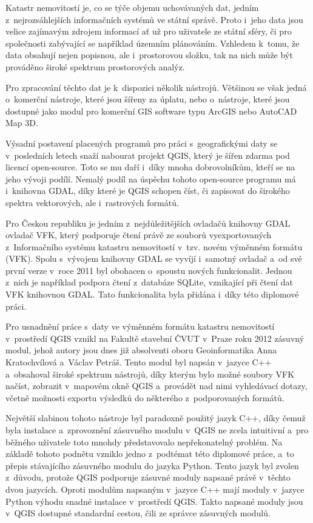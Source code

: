 \documentclass[a4paper,12pt,oneside]{book}
\begin{document}
Katastr nemovitostí je, co se týče objemu uchovávaných dat, jedním z~nejrozsáhlejších informačních systémů ve státní správě. Proto i~jeho data jsou velice zajímavým zdrojem informací ať už pro uživatele ze státní sféry, či pro společnosti zabývající se například územním plánováním. Vzhledem k~tomu, že data obsahují nejen popisnou, ale i~prostorovou složku, tak na nich může být prováděno široké spektrum prostorových analýz.

Pro zpracování těchto dat je k~dispozici několik nástrojů. Většinou se však jedná o~komerční nástroje, které jsou šířeny za úplatu, nebo o~nástroje, které jsou dostupné jako modul pro komerční GIS software typu ArcGIS nebo AutoCAD Map 3D. 

Výsadní postavení placených programů pro práci s~geografickými daty se v~posledních letech snaží nabourat projekt QGIS, který je šířen zdarma pod licencí open-source. Toto se mu daří i~díky mnoha dobrovolníkům, kteří se na jeho vývoji podílí. Nemalý podíl na úspěchu tohoto open-source programu má i~knihovna GDAL, díky které je QGIS schopen číst, či zapisovat do širokého spektra vektorových, ale i~rastrových formátů. 

Pro Českou republiku je jedním z~nejdůležitějších ovladačů knihovny GDAL ovladač VFK, který podporuje čtení právě ze souborů vyexportovaných z~Informačního systému katastru nemovitostí v~tzv. novém výměnném formátu (VFK). Spolu s~vývojem knihovny GDAL se vyvíjí i~samotný ovladač a~od své první verze v~roce 2011 byl obohacen o~spoustu nových funkcionalit. Jednou z~nich je například podpora čtení z~databáze SQLite, vznikající při čtení dat VFK knihovnou GDAL. Tato funkcionalita byla přidána i~díky této diplomové práci.

Pro usnadnění práce s~daty ve výměnném formátu katastru nemovitostí v~prostředí QGIS vznikl na Fakultě stavební ČVUT v~Praze roku 2012 zásuvný modul, jehož autory jsou dnes již absolventi oboru Geoinformatika Anna Kratochvílová a~Václav Petráš. Tento modul byl napsán v~jazyce C++ a~obsahoval široké spektrum nástrojů, díky kterým bylo možné soubory VFK načíst, zobrazit v~mapovém okně QGIS a~provádět nad nimi vyhledávací dotazy, včetně možnosti exportu výsledků do některého z~podporovaných formátů.

Největší slabinou tohoto nástroje byl paradoxně použitý jazyk C++, díky čemuž byla instalace a~zprovoznění zásuvného modulu v~QGIS ne zcela intuitivní a~pro běžného uživatele toto mnohdy představovalo nepřekonatelný problém. Na základě tohoto podnětu vzniklo jedno z~podtémat této diplomové práce, a~to přepis stávajícího zásuvného modulu do jazyka Python. Tento jazyk byl zvolen z~důvodu, protože QGIS podporuje zásuvné moduly napsané právě v~těchto dvou jazycích. Oproti modulům napsaným v~jazyce C++ mají moduly v~jazyce Python výhodu snadné instalace v~prostředí QGIS. Takto napsané moduly jsou v~QGIS dostupné standardní cestou, čili ze správce zásuvných modulů.
\end{document}
